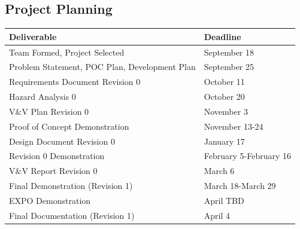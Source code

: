 \documentclass[12pt]{article}
\begin{document}
\subsection{Project Planning}
\begin{table}[H]
    \begin{tabular}{|l|l|}
    \hline
    \textbf{Deliverable}                          & \textbf{Deadline}      \\ \hline
    Team Formed, Project Selected                 & September 18           \\ \hline
    Problem Statement, POC Plan, Development Plan & September 25           \\ \hline
    Requirements Document Revision 0              & October 11             \\ \hline
    Hazard Analysis 0                             & October 20             \\ \hline
    V\&V Plan Revision 0                          & November 3             \\ \hline
    Proof of Concept Demonstration                & November 13-24         \\ \hline
    Design Document Revision 0                    & January 17             \\ \hline
    Revision 0 Demonstration                      & February 5-February 16 \\ \hline
    V\&V Report Revision 0                        & March 6                \\ \hline
    Final Demonstration (Revision 1)              & March 18-March 29      \\ \hline
    EXPO Demonstration                            & April TBD              \\ \hline
    Final Documentation (Revision 1)              & April 4                \\ \hline
    \end{tabular}
\end{table}
\end{document}
